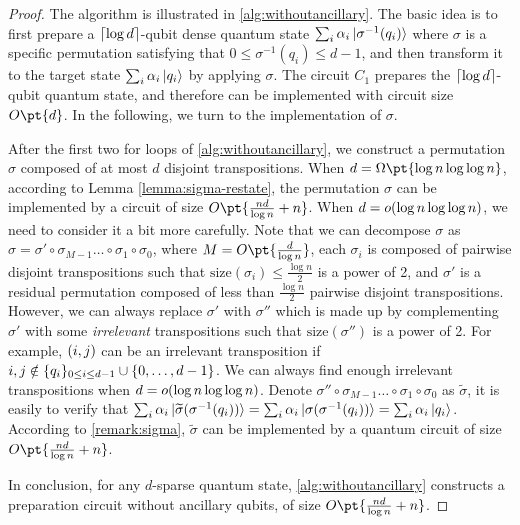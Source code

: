 \documentclass[a4paper,UKenglish,cleveref, autoref, thm-restate]{lipics-v2021}
\DeclarePairedDelimiter\rbra{\lparen}{\rparen}
\DeclarePairedDelimiter\cbra{\{}{\}}
\DeclarePairedDelimiter\ceil{\lceil}{\rceil}
\newcommand{\bo}{O\pt}
\newcommand{\om}{\Omega\pt}
\begin{document}
\begin{proof}
    The algorithm is illustrated in \cref{alg:withoutancillary}. 
    The basic idea is to first prepare a $\ceil{\log d}$-qubit dense quantum state $\sum_i \alpha_i \ket{\sigma^{-1}(q_i)}$ where $\sigma$ is a specific permutation satisfying that $0 \leq \sigma^{-1}(q_i) \leq d - 1$, and then transform it to the target state $\sum_i \alpha_i \ket{q_i}$ by applying $\sigma$. The circuit $C_1$ prepares the $\ceil{\log d}$-qubit quantum state, and therefore can be implemented with circuit size $\bo{d}$. In the following, we turn to the implementation of $\sigma$.
    
    After the first two for loops of \cref{alg:withoutancillary}, we construct a permutation $\sigma$ composed of at most $d$ disjoint transpositions.  When $d = \om{\log n \log \log n}$, according to Lemma \ref{lemma:sigma-restate}, the permutation $\sigma$ can be implemented by a circuit of size $\bo{\frac{nd}{\log n} + n}$. 
    When $d = o\rbra{\log n \log \log n}$, we need to consider it a bit more carefully. Note that we can decompose $\sigma$ as $\sigma = \sigma' \circ \sigma_{M-1} \dots \circ \sigma_1 \circ \sigma_0$, where $M = \bo{\frac{d}{\log n}}$, each $\sigma_i$ is composed of pairwise disjoint transpositions such that $\mathrm{size}(\sigma_i) \leq \frac{\log n}{2}$ is a power of 2, and $\sigma'$ is a residual permutation composed of less than $\frac{\log n}{2}$ pairwise disjoint transpositions. However, we can always replace $\sigma'$ with $\sigma''$ which is made up by complementing $\sigma'$ with some \textit{irrelevant} transpositions such that $\mathrm{size}(\sigma'')$ is a power of 2. For example, $\rbra{i, j}$ can be an irrelevant transposition if $i,j \notin \cbra{q_i}_{0 \leq i \leq d - 1} \cup \cbra{0, \dots, d-1}$. We can always find enough {irrelevant} transpositions when $d = o\rbra{\log n \log \log n}$. Denote $\sigma'' \circ \sigma_{M-1} \dots \circ \sigma_1 \circ \sigma_0$ as $\widetilde{\sigma}$, it is easily to verify that $\sum_i \alpha_i \ket{\widetilde{\sigma}\rbra{\sigma^{-1}(q_i)}} = \sum_i \alpha_i \ket{{\sigma}\rbra{\sigma^{-1}(q_i)}} = \sum_i \alpha_i \ket{q_i}$. According to \cref{remark:sigma}, $\widetilde{\sigma}$ can be implemented by a quantum circuit of size $\bo{\frac{nd}{\log n} + n}$. 
    
    In conclusion, for any $d$-sparse quantum state, \cref{alg:withoutancillary} constructs a preparation circuit without ancillary qubits, of size $\bo{\frac{nd}{\log n} + n}$.
\end{proof}
\end{document}
